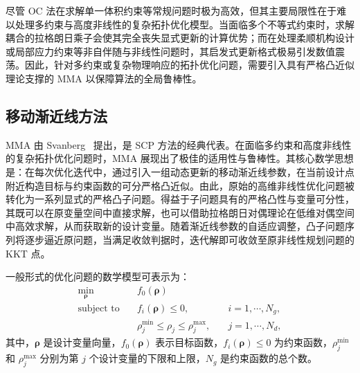 尽管 OC 法在求解单一体积约束等常规问题时极为高效，但其主要局限性在于难以处理多约束与高度非线性的复杂拓扑优化模型。当面临多个不等式约束时，求解耦合的拉格朗日乘子会使其完全丧失显式更新的计算优势；而在处理柔顺机构设计或局部应力约束等非自伴随与非线性问题时，其启发式更新格式极易引发数值震荡。因此，针对多约束或复杂物理响应的拓扑优化问题，需要引入具有严格凸近似理论支撑的 MMA 以保障算法的全局鲁棒性。


\subsection{移动渐近线方法}
\label{subsec:alg_mma}

MMA 由 Svanberg~\cite{svanbergMethodMovingAsymptotes1987} 提出，是 SCP 方法的经典代表。在面临多约束和高度非线性的复杂拓扑优化问题时，MMA 展现出了极佳的适用性与鲁棒性。其核心数学思想是：在每次优化迭代中，通过引入一组动态更新的移动渐近线参数，在当前设计点附近构造目标与约束函数的可分严格凸近似。由此，原始的高维非线性优化问题被转化为一系列显式的严格凸子问题。得益于子问题具有的严格凸性与变量可分性，其既可以在原变量空间中直接求解，也可以借助拉格朗日对偶理论在低维对偶空间中高效求解，从而获取新的设计变量。随着渐近线参数的自适应调整，凸子问题序列将逐步逼近原问题，当满足收敛判据时，迭代解即可收敛至原非线性规划问题的 KKT 点。

一般形式的优化问题的数学模型可表示为：
\[
\begin{aligned}
	\min_{\boldsymbol{\rho}}\quad&f_0(\boldsymbol{\rho})\\
	\text{subject~to}\quad&f_i(\boldsymbol{\rho}) \leq 0,\quad&{i}=1,\cdots,N_g,\\
	\quad&\rho_j^{\min}\leq{\rho}_j\leq{\rho}_j^{\max},\quad&{j}=1,\cdots,N_d,
\end{aligned}
\]
其中，$\boldsymbol{\rho}$ 是设计变量向量，$f_0(\boldsymbol{\rho})$ 表示目标函数，$f_i(\boldsymbol{\rho}) \leq 0$ 为约束函数，$\rho_j^{\min}$ 和 $\rho_j^{\max}$ 分别为第 $j$ 个设计变量的下限和上限，$N_g$ 是约束函数的总个数。

